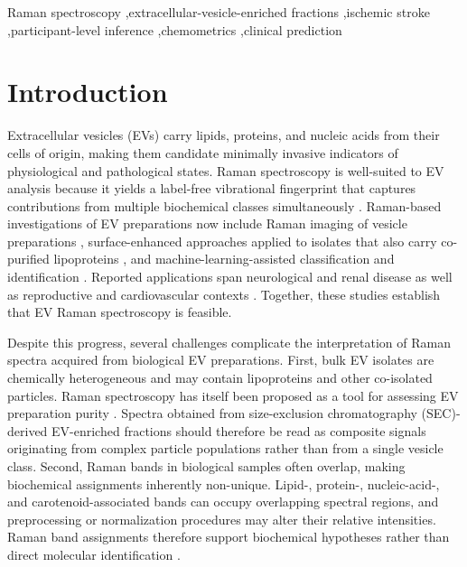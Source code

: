 \documentclass[preprint,12pt]{elsarticle}
\begin{document}
\begin{frontmatter}
\begin{keyword} Raman spectroscopy \sep extracellular-vesicle-enriched fractions \sep ischemic stroke \sep participant-level inference \sep chemometrics \sep clinical prediction \end{keyword}

\end{frontmatter}

\section{Introduction} 
\label{sec:introduction}

Extracellular vesicles (EVs) carry lipids, proteins, and nucleic acids from their cells of origin, making them candidate minimally invasive indicators of physiological and pathological states. Raman spectroscopy is well-suited to EV analysis because it yields a label-free vibrational fingerprint that captures contributions from multiple biochemical classes simultaneously \cite{liu2025}. Raman-based investigations of EV preparations now include Raman imaging of vesicle preparations \cite{horgan2020}, surface-enhanced approaches applied to isolates that also carry co-purified lipoproteins \cite{koster2021}, and machine-learning-assisted classification and identification \cite{lee2020, jensen2024}. Reported applications span neurological and renal disease \cite{imanbekova2021, kaminska2022} as well as reproductive and cardiovascular contexts \cite{zhang2020, buchan2025}. Together, these studies establish that EV Raman spectroscopy is feasible.

Despite this progress, several challenges complicate the interpretation of Raman spectra acquired from biological EV preparations. First, bulk EV isolates are chemically heterogeneous and may contain lipoproteins and other co-isolated particles. Raman spectroscopy has itself been proposed as a tool for assessing EV preparation purity \cite{gualerzi2019}. Spectra obtained from size-exclusion chromatography (SEC)-derived EV-enriched fractions should therefore be read as composite signals originating from complex particle populations rather than from a single vesicle class. Second, Raman bands in biological samples often overlap, making biochemical assignments inherently non-unique. Lipid-, protein-, nucleic-acid-, and carotenoid-associated bands can occupy overlapping spectral regions, and preprocessing or normalization procedures may alter their relative intensities. Raman band assignments therefore support biochemical hypotheses rather than direct molecular identification \cite{czamara2015, dreier2019, hobro2007}.
\end{document}
